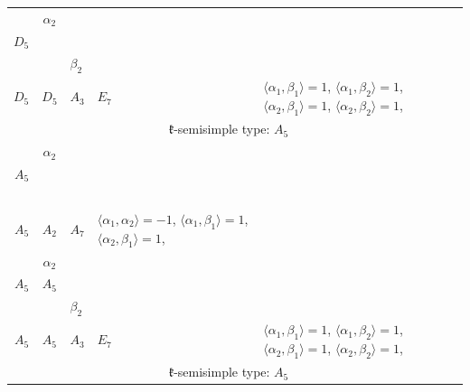 \documentclass[12pt]{report}
\begin{document}
\begin{appendix}
{\begin{longtable}{rcl p{1cm}p{1cm}p{3cm} }
\\
\begin{tabular}{cc}$\alpha_1$+ & $\alpha_2$\\\tiny{ $D_5$ } & \tiny{  }\end{tabular} &\begin{tabular}{c} = \\~ \end{tabular} & \begin{tabular}{cc}$\beta_1$+ & $\beta_2$\\\tiny{ $D_5$ } & \tiny{ $D_5$ }\end{tabular} & $A_3$ & $E_7$ &  $\langle\alpha_1, \beta_1\rangle=1$, $\langle\alpha_1, \beta_2\rangle=1$, $\langle\alpha_2, \beta_1\rangle=1$, $\langle\alpha_2, \beta_2\rangle=1$, 
\\
\hline\multicolumn{5}{c}{$\mathfrak{k}$-semisimple type: $A_5$}\\
\hline\hline\begin{tabular}{cc}$\alpha_1$+ & $\alpha_2$\\\tiny{ $A_5$ } & \tiny{  }\end{tabular} &\begin{tabular}{c} = \\~ \end{tabular} & \begin{tabular}{c}$\beta_1$\\\tiny{ $A_5$ }\end{tabular} & $A_2$ & $A_7$ & $\langle\alpha_1, \alpha_2\rangle=-1$,  $\langle\alpha_1, \beta_1\rangle=1$, $\langle\alpha_2, \beta_1\rangle=1$, 
\\
\begin{tabular}{cc}$\alpha_1$+ & $\alpha_2$\\\tiny{ $A_5$ } & \tiny{ $A_5$ }\end{tabular} &\begin{tabular}{c} = \\~ \end{tabular} & \begin{tabular}{cc}$\beta_1$+ & $\beta_2$\\\tiny{ $A_5$ } & \tiny{ $A_5$ }\end{tabular} & $A_3$ & $E_7$ &  $\langle\alpha_1, \beta_1\rangle=1$, $\langle\alpha_1, \beta_2\rangle=1$, $\langle\alpha_2, \beta_1\rangle=1$, $\langle\alpha_2, \beta_2\rangle=1$, 
\\
\hline\multicolumn{5}{c}{$\mathfrak{k}$-semisimple type: $A_5$}\\

\end{longtable}}
\end{appendix}
\end{document}
